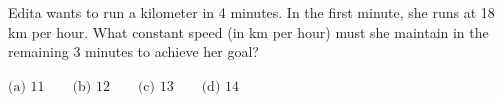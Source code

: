Edita wants to run a kilometer in 4 minutes. In the first minute, she runs at 18 km per hour. What constant speed (in km per hour) must she maintain in the remaining 3 minutes to achieve her goal?



$\text{(a) }11\qquad\text{(b) }12\qquad\text{(c) }13\qquad\text{(d) }14$
